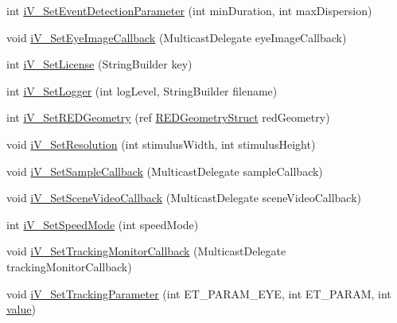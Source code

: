 \begin{DoxyCompactItemize}
\item 
int \hyperlink{class_web_analyzer_1_1_eye_tracking_1_1_eye_tracking_controller_a1d15a969f46265e3e3c8baec4e4900a7}{i\+V\+\_\+\+Set\+Event\+Detection\+Parameter} (int min\+Duration, int max\+Dispersion)
\item 
void \hyperlink{class_web_analyzer_1_1_eye_tracking_1_1_eye_tracking_controller_ae2b8be1fede54b23cb6a9b9a1c415ca3}{i\+V\+\_\+\+Set\+Eye\+Image\+Callback} (Multicast\+Delegate eye\+Image\+Callback)
\item 
int \hyperlink{class_web_analyzer_1_1_eye_tracking_1_1_eye_tracking_controller_a517add2f1ecf9ad73fcad7256d3ca7a9}{i\+V\+\_\+\+Set\+License} (String\+Builder key)
\item 
int \hyperlink{class_web_analyzer_1_1_eye_tracking_1_1_eye_tracking_controller_a13de540c735ced48a847b5aa21dc141d}{i\+V\+\_\+\+Set\+Logger} (int log\+Level, String\+Builder filename)
\item 
int \hyperlink{class_web_analyzer_1_1_eye_tracking_1_1_eye_tracking_controller_a1f1a48f3f1ad537d579aed49e0629e85}{i\+V\+\_\+\+Set\+R\+E\+D\+Geometry} (ref \hyperlink{struct_web_analyzer_1_1_eye_tracking_1_1_eye_tracking_controller_1_1_r_e_d_geometry_struct}{R\+E\+D\+Geometry\+Struct} red\+Geometry)
\item 
void \hyperlink{class_web_analyzer_1_1_eye_tracking_1_1_eye_tracking_controller_ae8143387e24ebf8fb5b31f32f9392826}{i\+V\+\_\+\+Set\+Resolution} (int stimulus\+Width, int stimulus\+Height)
\item 
void \hyperlink{class_web_analyzer_1_1_eye_tracking_1_1_eye_tracking_controller_a4c01964a370aee13b71f2c13dad03d5f}{i\+V\+\_\+\+Set\+Sample\+Callback} (Multicast\+Delegate sample\+Callback)
\item 
void \hyperlink{class_web_analyzer_1_1_eye_tracking_1_1_eye_tracking_controller_a1078dc05ce1ec37cf3e1292edaa18990}{i\+V\+\_\+\+Set\+Scene\+Video\+Callback} (Multicast\+Delegate scene\+Video\+Callback)
\item 
int \hyperlink{class_web_analyzer_1_1_eye_tracking_1_1_eye_tracking_controller_a90b563a9d8a5166d34d88d3d068281d5}{i\+V\+\_\+\+Set\+Speed\+Mode} (int speed\+Mode)
\item 
void \hyperlink{class_web_analyzer_1_1_eye_tracking_1_1_eye_tracking_controller_ab30f1d6155b8e5a6695984e4bb228b12}{i\+V\+\_\+\+Set\+Tracking\+Monitor\+Callback} (Multicast\+Delegate tracking\+Monitor\+Callback)
\item 
void \hyperlink{class_web_analyzer_1_1_eye_tracking_1_1_eye_tracking_controller_ac3f424469c9cee3c21dc65fa5e264987}{i\+V\+\_\+\+Set\+Tracking\+Parameter} (int E\+T\+\_\+\+P\+A\+R\+A\+M\+\_\+\+E\+Y\+E, int E\+T\+\_\+\+P\+A\+R\+A\+M, int \hyperlink{_u_i_2_h_t_m_l_resources_2js_2lib_2underscore_8min_8js_af7e1471ab89699458c4df8bb657298f6}{value})

\end{DoxyCompactItemize}
